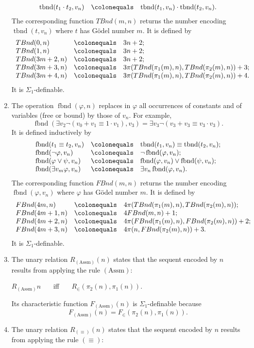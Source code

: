 \documentclass[leqno]{report}
\newcommand{\assm}{{(\mathrm{Assm})}}
\newcommand{\eq}{{(\equiv)}}
\newcommand{\tbnd}{\mathop{\mathrm{tbnd}}}
\newcommand{\fbnd}{\mathop{\mathrm{fbnd}}}
\begin{document}
\begin{enumerate}[1.]
\[\begin{array}{lll}
\tbnd (t_1 \cdot t_2, v_n) & \colonequals & \tbnd (t_1, v_n) \cdot \tbnd (t_2, v_n).
\end{array}
\]
The corresponding function $TBnd(m, n)$ returns the number encoding $\tbnd (t, v_n)$ where $t$ has G\"{o}del number $m$. It is defined by
\[
\begin{array}{lll}
TBnd(0, n) & \colonequals & 3n + 2; \cr
TBnd(1, n) & \colonequals & 3n + 2; \cr
TBnd(3m + 2, n) & \colonequals & 3n + 2; \cr
TBnd(3m + 3, n) & \colonequals & 3\pi (TBnd(\pi_1 (m), n), TBnd(\pi_2 (m), n)) + 3; \cr
TBnd(3m + 4, n) & \colonequals & 3\pi (TBnd(\pi_1 (m), n), TBnd(\pi_2 (m), n)) + 4.
\end{array}
\]
It is $\Sigma_1$-definable.
%
\item The operation $\fbnd (\varphi, n)$ replaces in $\varphi$ all occurrences of constants and of variables (free or bound) by those of $v_n$. For example,
\[
\fbnd (\exists v_2 \neg (v_0 + v_1 \equiv 1 \cdot v_1), v_3) = \exists v_3 \neg (v_3 + v_3 \equiv v_3 \cdot v_3).
\]
It is defined inductively by
\[
\begin{array}{lll}
\fbnd (t_1 \equiv t_2, v_n) & \colonequals & \tbnd (t_1, v_n) \equiv \tbnd (t_2, v_n);\cr
\fbnd (\neg\varphi, v_n) & \colonequals & \neg\fbnd (\varphi, v_n);\cr
\fbnd (\varphi\lor\psi, v_n) & \colonequals & \fbnd (\varphi, v_n) \lor \fbnd (\psi, v_n);\cr
\fbnd (\exists v_m \varphi, v_n) & \colonequals & \exists v_n \fbnd (\varphi, v_n).
\end{array}
\]
The corresponding function $FBnd(m, n)$ returns the number encoding $\fbnd (\varphi, v_n)$ where $\varphi$ has G\"{o}del number $m$. It is defined by
\[
\begin{array}{lll}
FBnd(4m, n) & \colonequals & 4\pi (TBnd(\pi_1 (m), n), TBnd(\pi_2 (m), n)); \cr
FBnd(4m + 1, n) & \colonequals & 4 FBnd(m, n) + 1; \cr
FBnd(4m + 2, n) & \colonequals & 4\pi (FBnd(\pi_1 (m), n), FBnd(\pi_2 (m), n)) + 2; \cr
FBnd(4m + 3, n) & \colonequals & 4\pi (n, FBnd(\pi_2 (m), n)) + 3.
\end{array}
\]
It is $\Sigma_1$-definable.
%
\item The unary relation $R_\assm (n)$ states that the sequent encoded by $n$ results from applying the rule $\assm$:
\begin{center}
$R_\assm n$ \ \ \ iff \ \ \ $R_\in (\pi_2 (n), \pi_1 (n))$.
\end{center}
Its characteristic function $F_\assm (n)$ is $\Sigma_1$-definable because
\[
F_\assm (n) = F_\in (\pi_2 (n), \pi_1 (n)).
\]
%
\item The unary relation $R_\eq (n)$ states that the sequent encoded by $n$ results from applying the rule $\eq$:

\end{enumerate}
\end{document}
